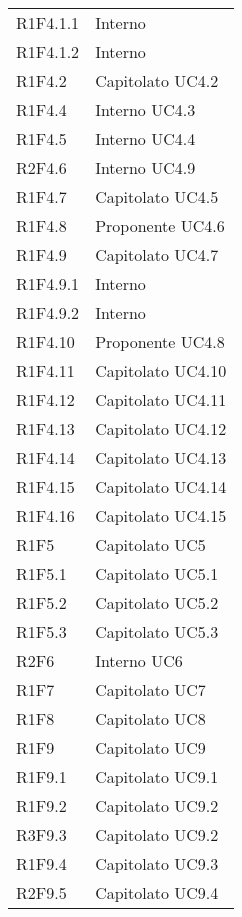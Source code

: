 \begin{longtable} {
			>{\centering}p{28mm}  
			>{}p{20mm}
		}
		R1F4.1.1 & Interno \TBstrut \\ [2mm]
		R1F4.1.2 & Interno \TBstrut \\ [2mm]		
		R1F4.2 & Capitolato UC4.2 \TBstrut \\ [2mm]				
		R1F4.4 & Interno UC4.3 \TBstrut \\ [2mm]
		R1F4.5 & Interno UC4.4 \TBstrut \\ [2mm]
		R2F4.6 & Interno UC4.9 \TBstrut \\ [2mm]
		R1F4.7 & Capitolato UC4.5 \TBstrut \\ [2mm]
		R1F4.8 & Proponente UC4.6 \TBstrut \\ [2mm]
		R1F4.9 & Capitolato UC4.7 \TBstrut \\ [2mm]
		R1F4.9.1 & Interno \TBstrut \\ [2mm]
		R1F4.9.2 & Interno \TBstrut \\ [2mm]
		R1F4.10 & Proponente UC4.8 \TBstrut \\ [2mm]
		R1F4.11 & Capitolato UC4.10 \TBstrut \\ [2mm]
		R1F4.12 & Capitolato UC4.11 \TBstrut \\ [2mm]
		R1F4.13 & Capitolato UC4.12 \TBstrut \\ [2mm]
		R1F4.14 & Capitolato UC4.13 \TBstrut \\ [2mm]
		R1F4.15 & Capitolato UC4.14 \TBstrut \\ [2mm]
		R1F4.16 & Capitolato UC4.15 \TBstrut \\ [2mm]
		R1F5 & Capitolato UC5 \TBstrut \\ [2mm]
		R1F5.1 & Capitolato UC5.1 \TBstrut \\ [2mm]
		R1F5.2 & Capitolato UC5.2 \TBstrut \\ [2mm]
		R1F5.3 & Capitolato UC5.3 \TBstrut \\ [2mm]
		R2F6 & Interno UC6 \TBstrut \\ [2mm]		
		R1F7 & Capitolato UC7 \TBstrut \\ [2mm]
		R1F8 & Capitolato UC8 \TBstrut \\ [2mm]
		R1F9 & Capitolato UC9 \TBstrut \\ [2mm]
		R1F9.1 & Capitolato UC9.1 \TBstrut \\ [2mm]
		R1F9.2 & Capitolato UC9.2 \TBstrut \\ [2mm]
		R3F9.3 & Capitolato UC9.2 \TBstrut \\ [2mm]
		R1F9.4 & Capitolato UC9.3 \TBstrut \\ [2mm]
		R2F9.5 & Capitolato UC9.4 \TBstrut \\ [2mm]

\end{longtable}
